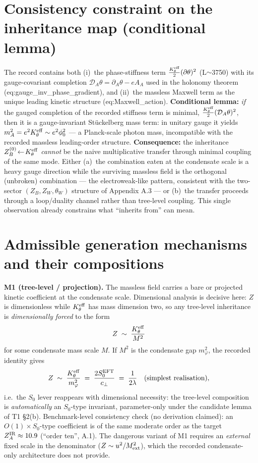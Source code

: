 \documentclass[11pt,a4paper]{article}
\begin{document}
\section{Consistency constraint on the inheritance map (conditional lemma)}
The record contains both (i)~the phase-stiffness term
$\tfrac{K_\theta^{\rm eff}}{2}(\partial\theta)^2$ (L$\sim$3750) with its
gauge-covariant completion $\mathcal D_A\theta=\partial_A\theta-eA_A$ used in the
holonomy theorem (eq:gauge\_inv\_phase\_gradient), and (ii)~the massless Maxwell
term as the unique leading kinetic structure (eq:Maxwell\_action).
\textbf{Conditional lemma:} \emph{if} the gauged completion of the recorded
stiffness term is minimal, $\tfrac{K_\theta^{\rm eff}}{2}(\mathcal D_A\theta)^2$,
then it is a gauge-invariant St\"uckelberg mass term: in unitary gauge it yields
$m_A^2=e^2K_\theta^{\rm eff}\sim e^2\phi_0^2$ --- a Planck-scale photon mass,
incompatible with the recorded massless leading-order structure. \textbf{
Consequence:} the inheritance $Z_B^{(0)}\!\leftarrow\!K_\theta^{\rm eff}$
\emph{cannot} be the naive multiplicative transfer through minimal coupling of the
same mode. Either (a)~the combination eaten at the condensate scale is a heavy
gauge direction while the surviving massless field is the orthogonal (unbroken)
combination --- the electroweak-like pattern, consistent with the two-sector
$(Z_B,Z_W,\theta_W)$ structure of Appendix A.3 --- or (b)~the transfer proceeds
through a loop/duality channel rather than tree-level coupling. This single
observation already constrains what ``inherits from'' can mean.

\section{Admissible generation mechanisms and their compositions}
\textbf{M1 (tree-level / projection).} The massless field carries a bare or
projected kinetic coefficient at the condensate scale. Dimensional analysis is
decisive here: $Z$ is dimensionless while $K_\theta^{\rm eff}$ has mass dimension
two, so any tree-level inheritance is \emph{dimensionally forced} to the form
\[
Z\;\sim\;\frac{K_\theta^{\rm eff}}{M^2}
\]
for some condensate mass scale $M$. If $M^2$ is the condensate gap
$m_\varphi^2$, the recorded identity gives
\[
Z\;\sim\;\frac{K_\theta^{\rm eff}}{m_\varphi^2}\;=\;\frac{2S_0^{\rm EFT}}
{c_\perp}\;=\;\frac{1}{2\lambda}\quad\text{(simplest realisation)},
\]
i.e.\ the $S_0$ lever reappears with dimensional necessity: the tree-level
composition is \emph{automatically} an $S_0$-type invariant, parameter-only under
the candidate lemma of T1 \S2(b). Benchmark-level consistency check (no
derivation claimed): an $O(1)\times S_0$-type coefficient is of the same moderate
order as the target $Z_A^{\rm IR}\approx10.9$ (``order ten'', A.1). The dangerous
variant of M1 requires an \emph{external} fixed scale in the denominator
($Z\sim u^2/M_{\rm ext}^2$), which the recorded condensate-only architecture does
not provide.
\end{document}
